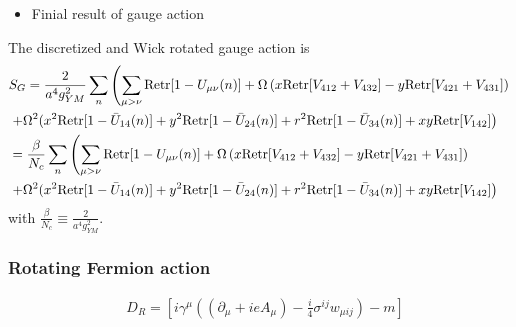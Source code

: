 \begin{itemize}
  \item Finial result of gauge action
\end{itemize}

The discretized and Wick rotated gauge action is
\begin{equation}
\begin{split}
&S_G=\frac{2}{a^4g_{YM}^2}\sum _{n}\left(\sum _{\mu >\nu}{\rm Retr}[1-U_{\mu\nu}(n)]+\Omega\left(x{\rm Retr}[V_{412}+V_{432}]-y{\rm Retr}[V_{421}+V_{431}]\right)\right.\\
&\left.+\Omega^2(x^2{\rm Retr}[1-\bar{U}_{14}(n)]+y^2{\rm Retr}[1-\bar{U}_{24}(n)]+r^2{\rm Retr}[1-\bar{U}_{34}(n)]+xy{\rm Retr}[V_{142}]\right)\\
&=\frac{\beta}{N_c}\sum _{n}\left(\sum _{\mu >\nu}{\rm Retr}[1-U_{\mu\nu}(n)]+\Omega\left(x{\rm Retr}[V_{412}+V_{432}]-y{\rm Retr}[V_{421}+V_{431}]\right)\right.\\
&\left.+\Omega^2(x^2{\rm Retr}[1-\bar{U}_{14}(n)]+y^2{\rm Retr}[1-\bar{U}_{24}(n)]+r^2{\rm Retr}[1-\bar{U}_{34}(n)]+xy{\rm Retr}[V_{142}]\right)\\
\end{split}
\end{equation}
with $\frac{\beta}{N_c} \equiv \frac{2}{a^4g_{YM}^2}$.

\subsubsection{\label{sec:RotatingFermionAction}Rotating Fermion action}

\begin{equation}
\begin{split}
&D_R=\left[i\gamma ^{\mu}\left((\partial _{\mu}+ieA_{\mu})-\frac{i}{4}\sigma ^{ij}w_{\mu ij}\right)-m\right]
\end{split}
\end{equation}

